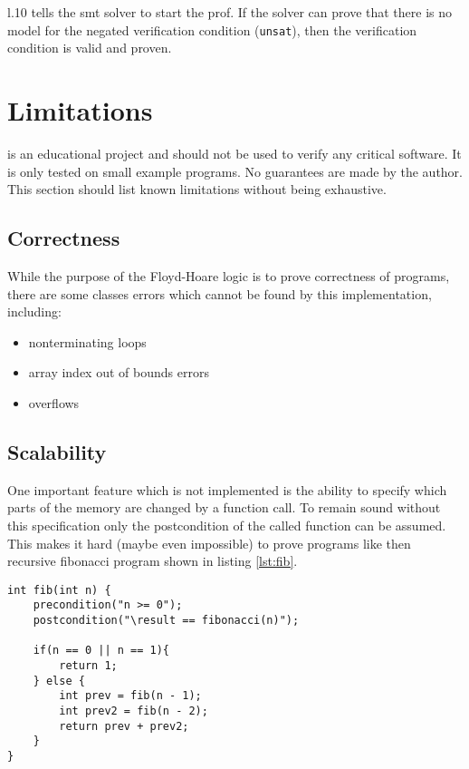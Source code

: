 \documentclass[12pt]{article}
\begin{document}
l.10 tells the smt solver to start the prof. 
If the solver can prove that there is no model for the negated verification condition (\texttt{unsat}), then the verification condition is valid and proven.

\section{Limitations}

\verifyc is an educational project and should not be used to verify any critical software.
It is only tested on small example programs.
No guarantees are made by the author.
This section should list known limitations without being exhaustive.

\subsection{Correctness}
\label{correctness}
While the purpose of the Floyd-Hoare logic is to prove correctness of programs,
there are some classes errors which cannot be found by this implementation, including:
\begin{itemize}
    \item nonterminating loops
    \item array index out of bounds errors
    \item overflows
\end{itemize}

\subsection{Scalability}
\label{completeness}
One important feature which is not implemented is the ability to specify which parts of the memory are
changed by a function call.
To remain sound without this specification only the postcondition of the called function can be assumed.
This makes it hard (maybe even impossible) to prove programs like then recursive fibonacci program shown in listing \ref{lst:fib}.

\begin{minipage}{\linewidth}
\begin{lstlisting}[style=c0, caption=a recursive fibonacci program, label=lst:fib]
int fib(int n) {
    precondition("n >= 0");
    postcondition("\result == fibonacci(n)");

    if(n == 0 || n == 1){
        return 1;
    } else {
        int prev = fib(n - 1);
        int prev2 = fib(n - 2);
        return prev + prev2;
    }
}
\end{lstlisting}
\end{minipage}
\end{document}
